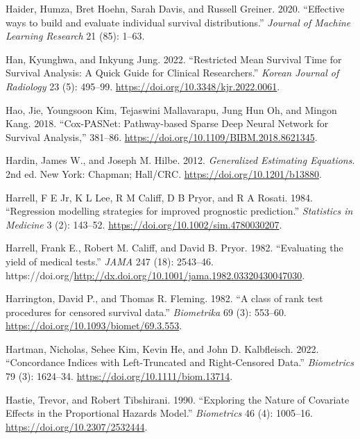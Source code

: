 \documentclass[
  letterpaper,
  krantz2]{style/krantz}
\newlength{\cslhangindent}
\newenvironment{CSLReferences}[2] %
 {\begin{list}{}{%
  \setlength{\itemindent}{0pt}
  \setlength{\leftmargin}{0pt}
  \setlength{\parsep}{0pt}
  \ifodd #1
   \setlength{\leftmargin}{\cslhangindent}
   \setlength{\itemindent}{-1\cslhangindent}
  \fi
  \setlength{\itemsep}{#2\baselineskip}}}
 {\end{list}}
\begin{document}
\begin{CSLReferences}{1}{0}
Haider, Humza, Bret Hoehn, Sarah Davis, and Russell Greiner. 2020.
{``{Effective ways to build and evaluate individual survival
distributions}.''} \emph{Journal of Machine Learning Research} 21 (85):
1--63.

Han, Kyunghwa, and Inkyung Jung. 2022. {``Restricted {Mean Survival
Time} for {Survival Analysis}: {A Quick Guide} for {Clinical
Researchers}.''} \emph{Korean Journal of Radiology} 23 (5): 495--99.
\url{https://doi.org/10.3348/kjr.2022.0061}.

Hao, Jie, Youngsoon Kim, Tejaswini Mallavarapu, Jung Hun Oh, and Mingon
Kang. 2018. {``{Cox-PASNet: Pathway-based Sparse Deep Neural Network for
Survival Analysis},''} 381--86.
\url{https://doi.org/10.1109/BIBM.2018.8621345}.

Hardin, James W., and Joseph M. Hilbe. 2012. \emph{Generalized
{Estimating Equations}}. 2nd ed. New York: Chapman; Hall/CRC.
\url{https://doi.org/10.1201/b13880}.

Harrell, F E Jr, K L Lee, R M Califf, D B Pryor, and R A Rosati. 1984.
{``{Regression modelling strategies for improved prognostic
prediction.}''} \emph{Statistics in Medicine} 3 (2): 143--52.
\url{https://doi.org/10.1002/sim.4780030207}.

Harrell, Frank E., Robert M. Califf, and David B. Pryor. 1982.
{``{Evaluating the yield of medical tests}.''} \emph{JAMA} 247 (18):
2543--46.
https://doi.org/\url{http://dx.doi.org/10.1001/jama.1982.03320430047030}.

Harrington, David P., and Thomas R. Fleming. 1982. {``{A class of rank
test procedures for censored survival data}.''} \emph{Biometrika} 69
(3): 553--60. \url{https://doi.org/10.1093/biomet/69.3.553}.

Hartman, Nicholas, Sehee Kim, Kevin He, and John D. Kalbfleisch. 2022.
{``Concordance Indices with Left-Truncated and Right-Censored Data.''}
\emph{Biometrics} 79 (3): 1624--34.
\url{https://doi.org/10.1111/biom.13714}.

Hastie, Trevor, and Robert Tibshirani. 1990. {``{Exploring the Nature of
Covariate Effects in the Proportional Hazards Model}.''}
\emph{Biometrics} 46 (4): 1005--16.
\url{https://doi.org/10.2307/2532444}.


\end{CSLReferences}
\end{document}
